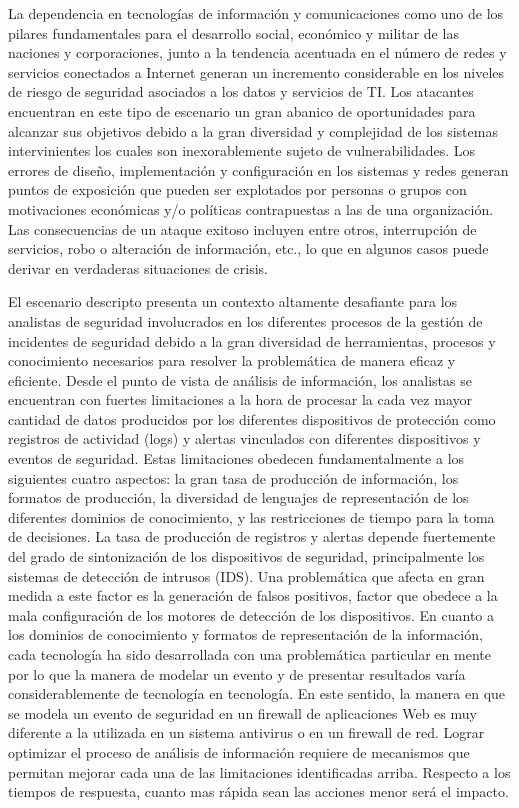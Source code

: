 \documentclass[a4paper]{./plantillas/llncs}
\begin{document}
La dependencia en tecnologías de información y comunicaciones como uno de los pilares fundamentales para el desarrollo social, económico y militar de las naciones y corporaciones,  junto a la tendencia acentuada en el número de redes y servicios conectados a Internet generan un incremento considerable en los niveles de riesgo de seguridad asociados a los datos y servicios de TI. Los atacantes encuentran en este tipo de escenario un gran abanico de oportunidades para alcanzar sus objetivos debido a la gran diversidad y complejidad de los sistemas intervinientes los cuales son inexorablemente sujeto de vulnerabilidades. Los errores de diseño, implementación y configuración en los sistemas y redes generan puntos de exposición que pueden ser explotados por personas o grupos con motivaciones económicas y/o políticas contrapuestas a las de una organización. Las consecuencias de un ataque exitoso incluyen entre otros, interrupción de servicios, robo o alteración de información, etc., lo que en algunos casos puede derivar en verdaderas situaciones de crisis. 

El escenario descripto presenta un contexto altamente desafiante para los analistas de seguridad involucrados en los diferentes procesos de la gestión de incidentes de seguridad debido a la gran diversidad de herramientas, procesos y conocimiento necesarios para resolver la problemática de manera eficaz y eficiente. Desde el punto de vista de análisis de información, los analistas se encuentran con fuertes limitaciones a la hora de procesar la cada vez mayor cantidad de datos producidos por los diferentes dispositivos de protección como registros de actividad (logs) y alertas vinculados con diferentes dispositivos y eventos de seguridad. Estas limitaciones obedecen fundamentalmente a los siguientes cuatro aspectos: la gran tasa de producción de información, los formatos de producción, la diversidad de lenguajes de representación de los diferentes dominios de conocimiento, y las restricciones de tiempo para la toma de decisiones. La tasa de producción de registros y alertas depende fuertemente del grado de sintonización de los dispositivos de seguridad, principalmente los sistemas de detección de intrusos (IDS). Una problemática que afecta en gran medida a este factor es la generación de falsos positivos, factor que obedece a la mala configuración de los motores de detección de los dispositivos. En cuanto a los dominios de conocimiento y formatos de representación de la información, cada tecnología ha sido desarrollada con una problemática particular en mente por lo que la manera de modelar un evento y de presentar resultados varía considerablemente de tecnología en tecnología. En este sentido, la manera en que se modela un evento de seguridad en un firewall de aplicaciones Web es muy diferente a la utilizada en un sistema antivirus o en un firewall de red. Lograr optimizar el proceso de análisis de información requiere de mecanismos que permitan mejorar cada una de las limitaciones identificadas arriba. Respecto a los tiempos de respuesta, cuanto mas rápida sean las acciones menor será el impacto. 
\end{document}
